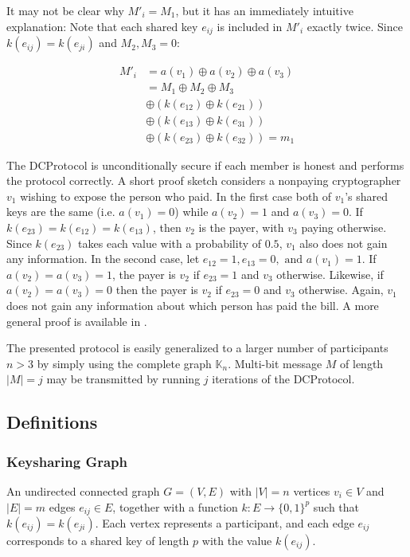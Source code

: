 It may not be clear why $M'_i = M_1$, but it has an immediately intuitive explanation:
Note that each shared key $e_{ij}$ is included in $M'_i$ exactly twice.
Since $k(e_{ij}) = k(e_{ji})$ and $M_2, M_3 = 0$:

\begin{align*}
M'_i &= a(v_1) \oplus a(v_2) \oplus a(v_3) \\
     &= M_1 \oplus M_2 \oplus M_3 \\
     & \oplus (k(e_{12}) \oplus k(e_{21})) \\
     & \oplus (k(e_{13}) \oplus k(e_{31})) \\
     & \oplus (k(e_{23}) \oplus k(e_{32})) = m_1
\end{align*}

The \ac{DCProtocol} is unconditionally secure if each member is honest and performs the
protocol correctly. A short proof sketch considers a nonpaying cryptographer $v_1$
wishing to expose the person who paid. In the first case both of $v_1$'s shared keys are the same
(i.e. $a(v_1) = 0$) while $a(v_2) = 1$ and $a(v_3) = 0$. If $k(e_23) = k(e_12) = k(e_13)$, then $v_2$
is the payer, with $v_3$ paying otherwise. Since $k(e_23)$ takes each value with a probability
of $0.5$, $v_1$ also does not gain any information. In the second case, let $e_{12} = 1, e_{13} = 0, \text{ and } a(v_1) = 1$. If $a(v_2) = a(v_3) = 1$, the payer is $v_2$ if $e_{23} = 1$ and $v_3$ otherwise.
Likewise, if $a(v_2) = a(v_3) = 0$ then the payer is $v_2$ if $e_{23} = 0$ and $v_3$ otherwise.
Again, $v_1$ does not gain any information about which person has paid the bill.
A more general proof is available in \cite{journals/joc/Chaum88}.

The presented protocol is easily generalized to a larger number of participants $n > 3$ by simply
using the complete graph $\mathbb{K}_n$. Multi-bit message $M$ of length $|M| = j$
may be transmitted by running $j$ iterations of the \ac{DCProtocol}.  

\subsection{Definitions}

\subsubsection{Keysharing Graph}

An undirected connected graph $G = (V, E)$ with $|V| = n$ vertices $v_i \in V$ and $|E| = m$ edges $e_{ij} \in E$,
together with a function $k: E \rightarrow \{0, 1\}^p$ such that $k(e_{ij}) = k(e_{ji})$.
Each vertex represents a participant, and each edge $e_{ij}$ corresponds to a shared key of length $p$ with the value
$k(e_{ij})$.

